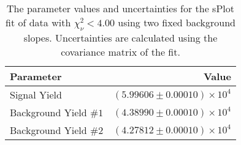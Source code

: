 
\begin{table}[ht]
    \begin{center}
        \begin{tabular}{lr}\toprule
            Parameter & Value \\\midrule
            Signal Yield & $(5.99606 \pm 0.00010) \times 10^{4}$ \\
            Background Yield $\#1$ & $(4.38990 \pm 0.00010) \times 10^{4}$ \\
            Background Yield $\#2$ & $(4.27812 \pm 0.00010) \times 10^{4}$ \\\bottomrule
        \end{tabular}
        \caption{The parameter values and uncertainties for the sPlot fit of data with $\chi^2_\nu < 4.00$ using two fixed background slopes. Uncertainties are calculated using the covariance matrix of the fit.}\label{tab:splot-fit-results-chisqdof-4.00-fixed-2}
    \end{center}
\end{table}
